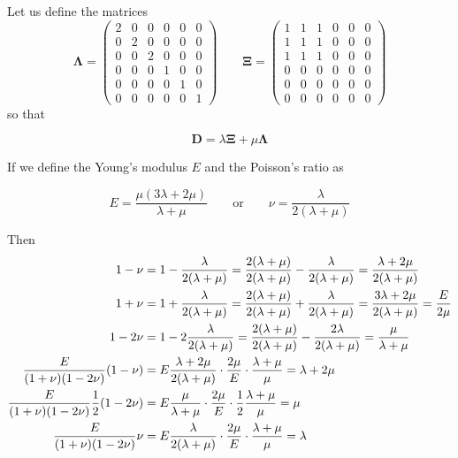 Let us define the matrices
\[
{\bm \Lambda}=
\left(
\begin{array}{cccccc}
2 & 0 & 0 & 0 & 0 & 0 \\
0 & 2 & 0 & 0 & 0 & 0 \\
0 & 0 & 2 & 0 & 0 & 0 \\
0 & 0 & 0 & 1 & 0 & 0 \\
0 & 0 & 0 & 0 & 1 & 0 \\
0 & 0 & 0 & 0 & 0 & 1 
\end{array}
\right)
\qquad
{\bm \Xi}=
\left(
\begin{array}{cccccc}
1 & 1 & 1 & 0 & 0 & 0\\ 
1 & 1 & 1 & 0 & 0 & 0\\ 
1 & 1 & 1 & 0 & 0 & 0\\ 
0 & 0 & 0 & 0 & 0 & 0 \\
0 & 0 & 0 & 0 & 0 & 0 \\
0 & 0 & 0 & 0 & 0 & 0 
\end{array}
\right)
\]
so that 
\begin{mdframed}[backgroundcolor=blue!5]
\[
{\bm D} = \lambda {\bm \Xi} + \mu {\bm \Lambda} 
\]
\end{mdframed}

If we define the Young's modulus $E$ and 
the Poisson's ratio as
\begin{mdframed}[backgroundcolor=blue!5]
\begin{equation}
E=\frac{\mu(3\lambda+2\mu)}{\lambda+\mu}
\qquad
\textrm{or}
\qquad
\nu=\frac{\lambda}{2(\lambda+\mu)}
\end{equation}
\end{mdframed}

Then 
\begin{align}
1-\nu
&=1-\frac{\lambda}{2(\lambda+\mu)}
=\frac{2(\lambda+\mu)}{2(\lambda+\mu)}-\frac{\lambda}{2(\lambda+\mu)}
=\frac{\lambda+2\mu}{2(\lambda+\mu)} \nn\\
1+\nu 
&= 1+\frac{\lambda}{2(\lambda+\mu)}
= \frac{2(\lambda+\mu)}{2(\lambda+\mu)}+\frac{\lambda}{2(\lambda+\mu)}
= \frac{3\lambda+2\mu}{2(\lambda+\mu)}
= \frac{E}{2\mu} \nn\\
1-2\nu 
&=1 -2 \frac{\lambda}{2(\lambda+\mu)} 
= \frac{2(\lambda+\mu)}{2(\lambda+\mu)}-\frac{2\lambda}{2(\lambda+\mu)}
= \frac{\mu}{\lambda+\mu} 
\nn\\ %
\frac{E}{(1+\nu)(1-2\nu)}(1-\nu)
&=
E
\frac{\lambda+2\mu}{2(\lambda+\mu)}
\cdot
\frac{2\mu}{E}
\cdot
\frac{\lambda+\mu}{\mu}
=\lambda+2\mu 
\nn\\ %
\frac{E}{(1+\nu)(1-2\nu)} \frac12(1-2\nu)
&=
E
\frac{\mu}{\lambda+\mu}
\cdot
\frac{2\mu}{E}
\cdot
\frac12 \frac{\lambda+\mu}{\mu} 
= \mu 
\nn\\ %
\frac{E}{(1+\nu)(1-2\nu)} \nu
&=
E\frac{\lambda}{2(\lambda+\mu)}
\cdot
\frac{2\mu}{E}
\cdot
\frac{\lambda+\mu}{\mu} 
= \lambda \nn
\end{align}

